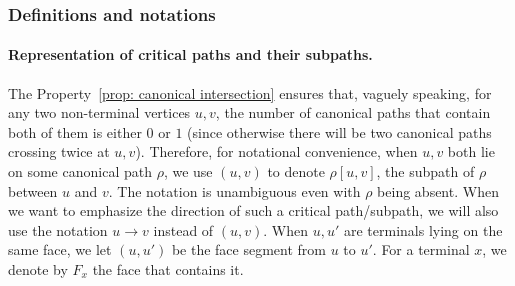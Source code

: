 \documentclass[11pt]{article}
\newcommand{\zihan}[1]{{\color{blue} Zihan: #1}}
\begin{document}


\subsubsection{Definitions and notations}

\paragraph{Representation of critical paths and their subpaths.} The Property~\ref{prop: canonical intersection} ensures that, vaguely speaking, for any two non-terminal vertices $u,v$, the number of canonical paths that contain both of them is either $0$ or $1$ (since otherwise there will be two canonical paths crossing twice at $u,v$). 
Therefore, for notational convenience, when $u,v$ both lie on some canonical path $\rho$, we use $(u,v)$ to denote $\rho[u,v]$, the subpath of $\rho$ between $u$ and $v$. The notation is unambiguous even with $\rho$ being absent.
When we want to emphasize the direction of such a critical path/subpath, we will also use the notation $u\to v$ instead of $(u,v)$.
%
When $u,u'$ are terminals lying on the same face, we let $(u,u')$ be the face segment from $u$ to $u'$.
For a terminal $x$, we denote by $F_x$ the face that contains it.
\end{document}
